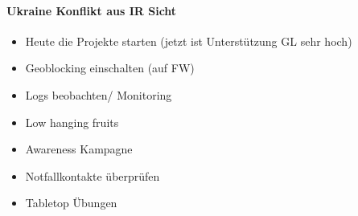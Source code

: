 \paragraph{Ukraine Konflikt aus IR Sicht}
\begin{itemize}
    \item Heute die Projekte starten (jetzt ist Unterstützung GL sehr hoch)
    \item Geoblocking einschalten (auf FW)
    \item Logs beobachten/ Monitoring
    \item Low hanging fruits
    \item Awareness Kampagne
    \item Notfallkontakte überprüfen
    \item Tabletop Übungen
\end{itemize}


